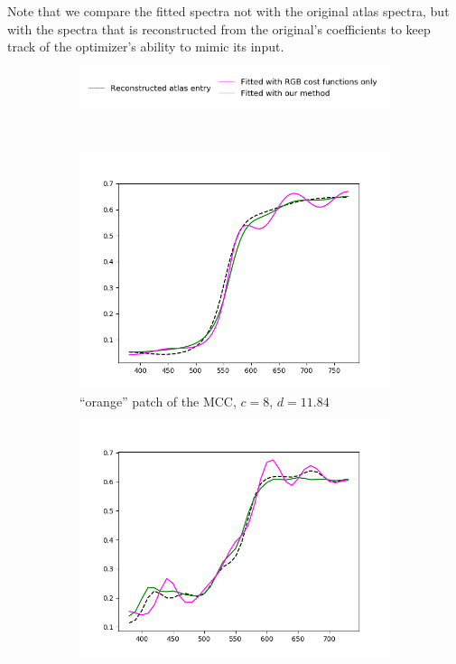 Note that we compare the fitted spectra not with the original atlas spectra, but with the spectra that is reconstructed from the original's coefficients to keep track of the optimizer's ability to mimic its input.

\begin{figure}[t]
	\centering
	\captionsetup[subfigure]{font=footnotesize,labelfont=footnotesize}
	\captionsetup[subfigure]{justification=centering}
	\begin{subfigure}[t]{0.70\textwidth}
		\includegraphics[width=\linewidth]{img/results_costFunctions_legend.png}
	\end{subfigure} \\
	\begin{subfigure}[t]{0.45\textwidth}
		\includegraphics[width=\linewidth]{img/results_costFunctions_orange.png}
		\caption{``orange'' patch of the MCC, $c = 8$, $d = 11.84$}
		\label{fig:resultsCostFunctions_orange}
	\end{subfigure} \hspace{0.1em}
	\begin{subfigure}[t]{0.45\textwidth}
		\includegraphics[width=\linewidth]{img/results_costFunctions_mcb0706.png}

\end{subfigure}
\end{figure}
